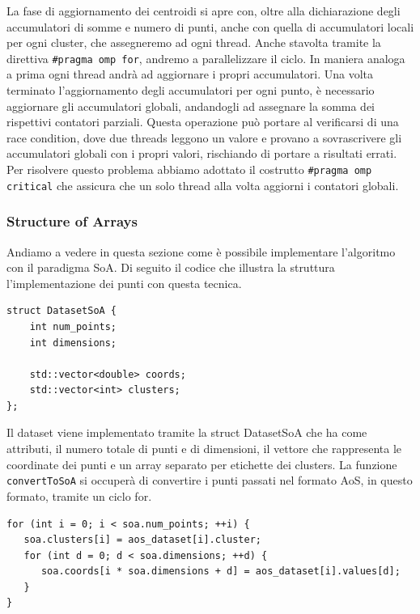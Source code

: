 \documentclass[10pt,twocolumn,letterpaper]{article}
\begin{document}
La fase di aggiornamento dei centroidi si apre con, oltre alla dichiarazione degli accumulatori di somme e numero di punti, anche con quella di accumulatori locali per ogni cluster, che assegneremo ad ogni thread. Anche stavolta tramite la direttiva \lstinline{#pragma omp for}, andremo a parallelizzare il ciclo. In maniera analoga a prima ogni thread andrà ad aggiornare i propri accumulatori. Una volta terminato l'aggiornamento degli accumulatori per ogni punto, è necessario aggiornare gli accumulatori globali, andandogli ad assegnare la somma dei rispettivi contatori parziali. Questa operazione può portare al verificarsi di una race condition, dove due threads leggono un valore e provano a sovrascrivere gli accumulatori globali con i propri valori, rischiando di portare a risultati errati. Per risolvere questo problema abbiamo adottato il costrutto \lstinline{#pragma omp critical} che assicura che un solo thread alla volta aggiorni i contatori globali.

\subsubsection{Structure of Arrays}
Andiamo a vedere in questa sezione come è possibile implementare l'algoritmo con il paradigma SoA. Di seguito il codice che illustra la struttura l'implementazione dei punti con questa tecnica.

\begin{lstlisting}[caption={struct \textit Implementazione dei punti nella versione SoA}, label={lst:openmp}]
struct DatasetSoA {
    int num_points;
    int dimensions;
   
    std::vector<double> coords; 
    std::vector<int> clusters;  
};

\end{lstlisting}

Il dataset viene implementato tramite la struct DatasetSoA che ha come attributi, il numero totale di punti e di dimensioni, il vettore che rappresenta le coordinate dei punti e un array separato per etichette dei clusters. La funzione \lstinline{convertToSoA} si occuperà di convertire i punti passati nel formato AoS, in questo formato, tramite un ciclo for. 

\begin{lstlisting}[caption={Ciclo for all'interno di convertToSoA}, label={lst:openmp}]
for (int i = 0; i < soa.num_points; ++i) {
   soa.clusters[i] = aos_dataset[i].cluster;
   for (int d = 0; d < soa.dimensions; ++d) {
      soa.coords[i * soa.dimensions + d] = aos_dataset[i].values[d];
   }
}
\end{lstlisting}
\end{document}
